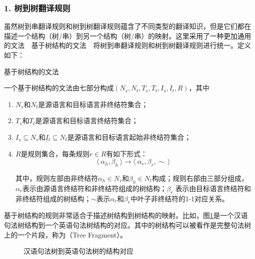 
\subsubsection{1. 树到树翻译规则}

\parinterval 虽然树到串翻译规则和树到树翻译规则蕴含了不同类型的翻译知识，但是它们都在描述一个结构（树/串）到另一个结构（树/串）的映射。这里采用了一种更加通用的文法\ \dash \ 基于树结构的文法\ \dash \ 将树到串翻译规则和树到树翻译规则进行统一。定义如下：

\vspace{0.5em}
\begin{definition} 基于树结构的文法

{\small
一个基于树结构的文法由七部分构成$(N_s, N_t, T_s, T_t, I_s, I_t, R)$，其中
\begin{enumerate}
\item $N_s$和$N_t$是源语言和目标语言非终结符集合；
\item $T_s$和$T_t$是源语言和目标语言终结符集合；
\item $I_s \subseteq N_s$和$I_t \subseteq N_t$是源语言和目标语言起始非终结符集合；
\item $R$是规则集合，每条规则$r \in R$有如下形式：
\vspace{-1em}
\begin{displaymath}
\langle\  \alpha_h, \beta_h\ \rangle \to \langle\ \alpha_r, \beta_r, \sim\ \rangle
\end{displaymath}

其中，规则左部由非终结符$\alpha_h \in N_s$和$\beta_h \in N_t$构成；规则右部由三部分组成，$\alpha_r$表示由源语言终结符和非终结符组成的树结构；$\beta_r$ 表示由目标语言终结符和非终结符组成的树结构；$\sim$表示$\alpha_r$和$\beta_r$中叶子非终结符的1-1对应关系。
\end{enumerate}
}
\end{definition}

\parinterval 基于树结构的规则非常适合于描述树结构到树结构的映射。比如，图\ref{fig:8-19}是一个汉语句法树结构到一个英语句法树结构的对应。其中的树结构可以被看作是完整句法树上的一个片段，称为{\small{}}（Tree Fragment）。

\begin{figure}[htp]
\centering

\vspace{-2em}
\caption{汉语句法树到英语句法树的结构对应}
\label{fig:8-19}
\end{figure}

